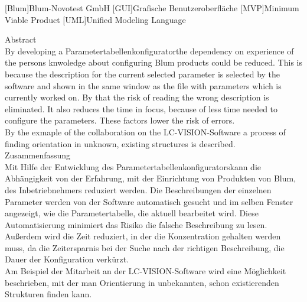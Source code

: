 \documentclass[12pt,a4paper]{article}
\begin{document}
\begin{acronym}[Abkürzungsverzeichnis]
[Blum]{Blum-Novotest GmbH}
[GUI]{Grafische Benutzeroberfläche}
[MVP]{Minimum Viable Product}
[UML]{Unified Modeling Language}
\end{acronym}
\newpage
\thispagestyle{empty}
\listoffigures
\newpage\setcounter{page}{1}\noindent
{\Large Abstract}\\\newline
\noindent
By developing a \glqq Parametertabellenkonfigurator\grqq\space the dependency on experience of the persons knwoledge about configuring Blum products could be reduced. This is because the description for the current selected parameter is selected by the software and shown in the same window as the file with parameters which is currently worked on. By that the risk of reading the wrong description is eliminated. It also reduces the time in focus, because of less time needed to configure the parameters. These factors lower the risk of errors.\\
By the exmaple of the collaboration on the \glqq LC-VISION\grqq -Software a process of finding orientation in unknown, existing structures is described.\\
\newline
\noindent
{\Large Zusammenfassung}\\
\newline
Mit Hilfe der Entwicklung des \glqq Parametertabellenkonfigurators\grqq kann die Abhängigkeit von der Erfahrung, mit der Einrichtung von Produkten von Blum, des Inbetriebnehmers reduziert werden. Die Beschreibungen der einzelnen Parameter werden von der Software automatisch gesucht und im selben Fenster angezeigt, wie die Parametertabelle, die aktuell bearbeitet wird. Diese Automatisierung minimiert das Risiko die falsche Beschreibung zu lesen. Außerdem wird die Zeit reduziert, in der die Konzentration gehalten werden muss, da die Zeitersparnis bei der Suche nach der richtigen Beschreibung, die Dauer der Konfiguration verkürzt.\\
Am Beispiel der Mitarbeit an der \glqq LC-VISION\grqq -Software wird eine Möglichkeit beschrieben, mit der man Orientierung in unbekannten, schon existierenden Strukturen finden kann.
\noindent

\newpage   
\end{document}
